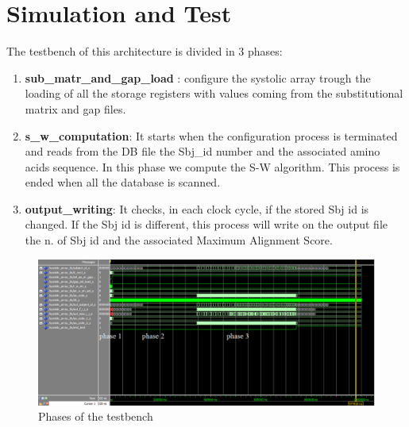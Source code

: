 \section{Simulation and Test} \label{simtest}
The testbench of this architecture is divided in 3 phases:
\begin{enumerate}
	\item \textbf{sub\_matr\_and\_gap\_load }:  configure the systolic array trough the loading of all the storage registers with values coming from the substitutional matrix and gap files.\\
	\item  \textbf{s\_w\_computation}: It starts when the configuration process is terminated and reads from the DB file the Sbj\_id number and the associated amino acids sequence. In this phase we compute the S-W algorithm. This process is ended when all the database is scanned.\\
	\item \textbf{output\_writing}: It checks, in each clock cycle, if the stored Sbj id is changed. If the Sbj id is different, this process will write on the output file the n. of Sbj id and the associated Maximum Alignment Score.
	
	
	
\end{enumerate}
\begin{figure}[h!]
	\centering
	\includegraphics[width=\textwidth]{imm/sw/tb_systolic_array_phases.png} 	\caption{Phases of the testbench} 
	\label{tb_sw}
\end{figure}

